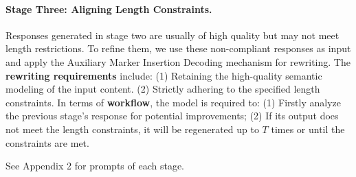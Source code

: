\paragraph{Stage Three: Aligning Length Constraints.} Responses generated in stage two are usually of high quality but may not meet length restrictions. To refine them, we use these non-compliant responses as input and apply the Auxiliary Marker Insertion Decoding mechanism for rewriting. The \textbf{rewriting requirements} include: (1) Retaining the high-quality semantic modeling of the input content. (2) Strictly adhering to the specified length constraints.
In terms of \textbf{workflow}, the model is required to: (1) Firstly analyze the previous stage's response for potential improvements; (2) If its output does not meet the length constraints, it will be regenerated up to $T$ times or until the constraints are met.


See Appendix 2 for prompts of each stage.


